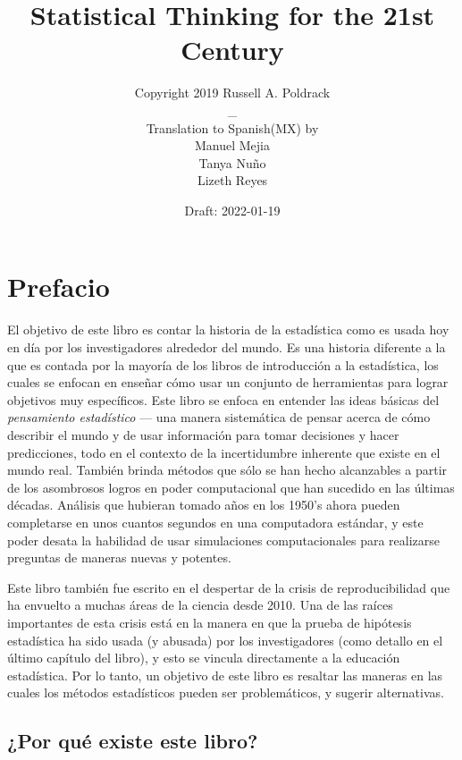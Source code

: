 \documentclass[
  12pt,
]{book}
\title{Statistical Thinking for the 21st Century}
\author{Copyright 2019 Russell A. Poldrack\\
\_\\
Translation to Spanish(MX) by\\
Manuel Mejia\\
Tanya Nuño\\
Lizeth Reyes}
\date{Draft: 2022-01-19}
\begin{document}
\maketitle

{
\hypersetup{linkcolor=}
\setcounter{tocdepth}{1}
\tableofcontents
}
\hypertarget{prefacio}{%
\chapter*{Prefacio}\label{prefacio}}

El objetivo de este libro es contar la historia de la estadística como es usada hoy en día por los investigadores alrededor del mundo. Es una historia diferente a la que es contada por la mayoría de los libros de introducción a la estadística, los cuales se enfocan en enseñar cómo usar un conjunto de herramientas para lograr objetivos muy específicos. Este libro se enfoca en entender las ideas básicas del \emph{pensamiento estadístico} --- una manera sistemática de pensar acerca de cómo describir el mundo y de usar información para tomar decisiones y hacer predicciones, todo en el contexto de la incertidumbre inherente que existe en el mundo real. También brinda métodos que sólo se han hecho alcanzables a partir de los asombrosos logros en poder computacional que han sucedido en las últimas décadas. Análisis que hubieran tomado años en los 1950's ahora pueden completarse en unos cuantos segundos en una computadora estándar, y este poder desata la habilidad de usar simulaciones computacionales para realizarse preguntas de maneras nuevas y potentes.

Este libro también fue escrito en el despertar de la crisis de reproducibilidad que ha envuelto a muchas áreas de la ciencia desde 2010. Una de las raíces importantes de esta crisis está en la manera en que la prueba de hipótesis estadística ha sido usada (y abusada) por los investigadores (como detallo en el último capítulo del libro), y esto se vincula directamente a la educación estadística. Por lo tanto, un objetivo de este libro es resaltar las maneras en las cuales los métodos estadísticos pueden ser problemáticos, y sugerir alternativas.

\hypertarget{por-quuxe9-existe-este-libro}{%
\section{¿Por qué existe este libro?}\label{por-quuxe9-existe-este-libro}}
\end{document}
